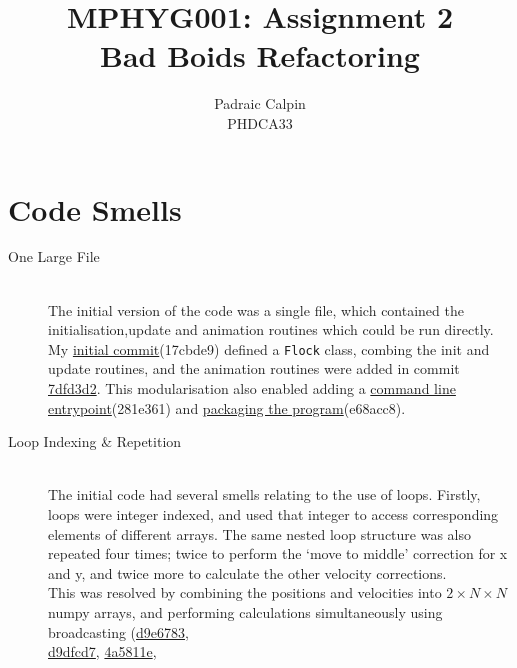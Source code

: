 \documentclass[12pt,a4paper]{article}
\begin{document}
\title{MPHYG001: Assignment 2 \\ Bad Boids Refactoring}
\author{Padraic Calpin \\ PHDCA33}
\date{}
\maketitle

\section*{Code Smells}
\begin{description}
    \item[One Large File] \hfill \\
    The initial version of the code was a single file, which contained the initialisation,update and animation routines which could be run directly. My \href{https://github.com/padraic-padraic/bad-boids/commit/17cbde9dd7f2d8dd756ac43fcf11577f34c0b754}{initial commit}(17cbde9) defined a \texttt{Flock} class, combing the init and update routines, and the animation routines were added in commit \href{https://github.com/padraic-padraic/bad-boids/commit/7dfd3d25a5b6de1802cb93cca317e5fb79a3af8f}{7dfd3d2}. This modularisation also enabled adding a \href{https://github.com/padraic-padraic/bad-boids/commit/281e361395665c5bfad25a8b719d4190dd13c77a}{command line entry\-point}(281e361) and \href{https://github.com/padraic-padraic/bad-boids/commit/e68acc89a2c399cb0831ca96b72e49037bb61c66}{packaging the program}(e68acc8).
    \item[Loop Indexing \& Repetition] \hfill \\
    The initial code had several smells relating to the use of loops. Firstly, loops were integer indexed, and used that integer to access corresponding elements of different arrays. The same nested loop structure was also repeated four times; twice to perform the `move to middle' correction for x and y, and twice more to calculate the other velocity corrections.\\
    This was resolved by combining the positions and velocities into $2\times N \times N$ numpy arrays, and performing calculations simultaneously using broadcasting  (\href{https://github.com/padraic-padraic/bad-boids/commit/d9e6783944c37458441bec59bca9e4b98d243345}{d9e6783},\\ \href{https://github.com/padraic-padraic/bad-boids/commit/d9dfcd71929bb125dd9353619b0fc9912ddc7ac6}{d9dfcd7}, \href{https://github.com/padraic-padraic/bad-boids/commit/4a5811e5a2377f76cacd545c37c7808f1908a94b}{4a5811e},

\end{description}
\end{document}
